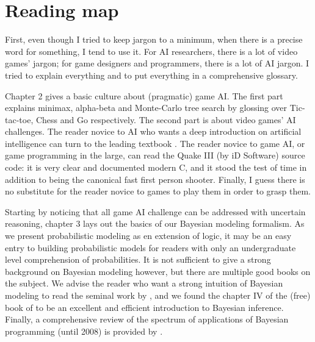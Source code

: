 

\section{Reading map}
First, even though I tried to keep jargon to a minimum, when there is a precise word for something, I tend to use it. For AI researchers, there is a lot of video games' jargon; for game designers and programmers, there is a lot of AI jargon. I tried to explain everything and to put everything in a comprehensive glossary.

Chapter 2 gives a basic culture about (pragmatic) game AI. The first part explains minimax, alpha-beta and Monte-Carlo tree search by glossing over Tic-tac-toe, Chess and Go respectively. The second part is about video games' AI challenges. The reader novice to AI who wants a deep introduction on artificial intelligence can turn to the leading textbook \citep{AIMA}. The reader novice to game AI, or game programming in the large, can read the Quake III (by iD Software) source code: it is very clear and documented modern C, and it stood the test of time in addition to being the canonical fast first person shooter. Finally, I guess there is no substitute for the reader novice to games to play them in order to grasp them.

Starting by noticing that all game AI challenge can be addressed with uncertain reasoning, chapter 3 lays out the basics of our Bayesian modeling formalism. As we present probabilistic modeling as en extension of logic, it may be an easy entry to building probabilistic models for readers with only an undergraduate level comprehension of probabilities. It is not sufficient to give a strong background on Bayesian modeling however, but there are multiple good books on the subject. We advise the reader who want a strong intuition of Bayesian modeling to read the seminal work by \cite{Jaynes}, and we found the chapter IV of the (free) book of \cite{MacKay} to be an excellent and efficient introduction to Bayesian inference. Finally, a comprehensive review of the spectrum of applications of Bayesian programming (until 2008) is provided by \citep{PRDMSMS}.

